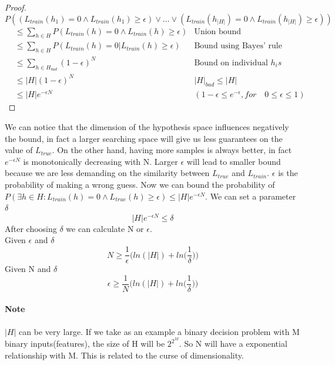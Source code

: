 \documentclass[main.tex]{subfiles}
\begin{document}
\newpage
\begin{proof}
$$P((L_{train}(h_1)=0 \land L_{train}(h_1) \geq \epsilon) \lor \dots \lor (L_{train}(h_{|H|})=0 \land L_{train}(h_{|H|}) \geq \epsilon))$$
\begin{align*}
    &\leq \sum_{h \in H} P(L_{train}(h)=0 \land L_{train}(h) \geq \epsilon) &\text{Union bound} \\
    &\leq \sum_{h \in H} P(L_{train}(h)=0 | L_{train}(h) \geq \epsilon) &\text{Bound using Bayes’ rule} \\
    &\leq \sum_{h \in H_{bad}} (1-\epsilon)^N &\text{Bound on individual }h_is \\
    &\leq |H|(1-\epsilon)^N & |H|_{bad}\leq|H| \\
    &\leq |H|e^{-\epsilon N} &(1-\epsilon \leq e^{-\epsilon},for \quad 0 \leq \epsilon \leq 1)
\end{align*}
\end{proof}
We can notice that the dimension of the hypothesis space influences negatively the bound, in fact a larger searching space will give us less guarantees on the value of $L_{true}$. On the other hand, having more samples is always better, in fact $e^{-\epsilon N}$ is monotonically decreasing with N. Larger $\epsilon$ will lead to smaller bound because we are less demanding on the similarity between $L_{true}$ and $L_{train}$. $\epsilon$ is the probability of making a wrong guess.
Now we can bound the probability of $P(\exists h \in H: L_{train}(h)=0 \land L_{true}(h) \geq \epsilon) \leq |H|e^{−\epsilon N}$. We can set a parameter $\delta$
\begin{equation*}
    |H|e^{-\epsilon N} \leq \delta
\end{equation*}
After choosing $\delta$ we can calculate N or $\epsilon$.\\
Given $\epsilon$ and $\delta$
\begin{equation}
    N \geq \frac{1}{\epsilon} \bigg( ln(|H|) + ln \bigg( \frac{1}{\delta} \bigg) \bigg)
\end{equation}
Given N and $\delta$
\begin{equation}
    \epsilon \geq \frac{1}{N} \bigg( ln(|H|) + ln \bigg( \frac{1}{\delta} \bigg) \bigg)
\end{equation}
\paragraph{Note} $|H|$ can be very large. If we take as an example a binary decision problem with M binary inputs(features), the size of H will be $2^{2^M}$. So N will have a exponential relationship with M. This is related to the curse of dimensionality.
\end{document}

